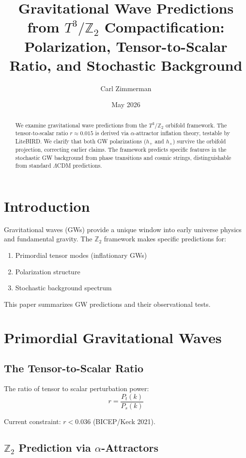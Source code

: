 \documentclass[12pt,a4paper]{article}
\title{Gravitational Wave Predictions from $T^3/\mathbb{Z}_2$ Compactification:\\
Polarization, Tensor-to-Scalar Ratio, and Stochastic Background}
\author{Carl Zimmerman}
\date{May 2026}
\begin{document}
\maketitle

\begin{abstract}
We examine gravitational wave predictions from the $T^3/\mathbb{Z}_2$ orbifold framework. The tensor-to-scalar ratio $r \approx 0.015$ is derived via $\alpha$-attractor inflation theory, testable by LiteBIRD. We clarify that both GW polarizations ($h_+$ and $h_\times$) survive the orbifold projection, correcting earlier claims. The framework predicts specific features in the stochastic GW background from phase transitions and cosmic strings, distinguishable from standard $\Lambda$CDM predictions.
\end{abstract}

\section{Introduction}

Gravitational waves (GWs) provide a unique window into early universe physics and fundamental gravity. The $\mathbb{Z}_2$ framework makes specific predictions for:
\begin{enumerate}
    \item Primordial tensor modes (inflationary GWs)
    \item Polarization structure
    \item Stochastic background spectrum
\end{enumerate}

This paper summarizes GW predictions and their observational tests.

\section{Primordial Gravitational Waves}

\subsection{The Tensor-to-Scalar Ratio}

The ratio of tensor to scalar perturbation power:
\begin{equation}
r = \frac{P_t(k)}{P_s(k)}
\end{equation}

Current constraint: $r < 0.036$ (BICEP/Keck 2021).

\subsection{$\mathbb{Z}_2$ Prediction via $\alpha$-Attractors}
\end{document}
